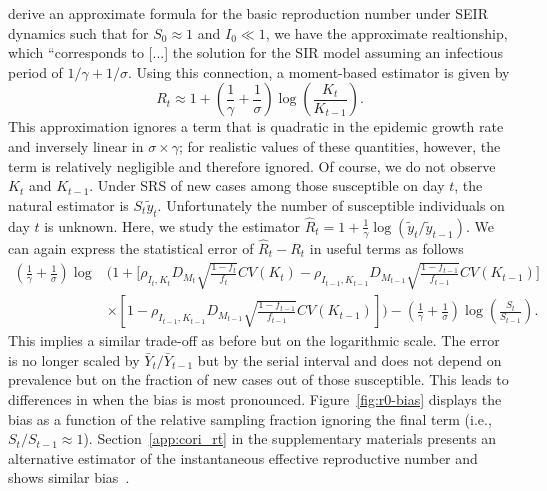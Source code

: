 \documentclass[11pt]{amsart}
\numberwithin{equation}{section}
\theoremstyle{plain}
\begin{document}
\cite{Heng2020} derive an approximate formula for the basic reproduction number under SEIR dynamics such that for $S_0 \approx 1$ and $I_0 \ll 1$, we have the approximate realtionship, which ``corresponds to [...] the solution for the SIR model assuming an infectious period of $1/\gamma + 1/\sigma$. Using this connection, a moment-based estimator is given by
$$
R_t \approx 1 + \left( \frac{1}{\gamma} + \frac{1}{\sigma} \right) \log \left( \frac{K_t}{K_{t-1}} \right).
$$
This approximation ignores a term that is quadratic in the epidemic growth rate and inversely linear in $\sigma \times \gamma$; for realistic values of these quantities, however, the term is relatively negligible and therefore ignored. Of course, we do not observe $K_t$ and $K_{t-1}$.  Under SRS of new cases among those susceptible on day $t$, the natural estimator is $S_t \tilde y_t$.  Unfortunately the number of susceptible individuals on day $t$ is unknown. Here, we study the estimator $\hat R_t = 1 + \frac{1}{\gamma} \log \left( \tilde y_t / \tilde y_{t-1} \right)$. We can again express the statistical error of $\hat R_t - R_t$ in useful terms as follows
 $$
 \begin{aligned}
 \left( \frac{1}{\gamma} + \frac{1}{\sigma} \right)\log &\bigg( 1 + \bigg[ \rho_{I_t,K_t} D_{M_t} \sqrt{\frac{1-f_t}{f_t}} CV (K_t)  -\rho_{I_{t-1},K_{t-1}} D_{M_{t-1}} \sqrt{\frac{1-f_{t-1}}{f_{t-1}}} CV (K_{t-1}) \bigg] \\
 &\times \left[ 1 - \rho_{I_{t-1},K_{t-1}} D_{M_{t-1}} \sqrt{\frac{1-f_{t-1}}{f_{t-1}}} CV (K_{t-1}) \right] \bigg) - \left( \frac{1}{\gamma} + \frac{1}{\sigma} \right) \log \left( \frac{S_t}{S_{t-1}} \right).
 \end{aligned}
 $$
 This implies a similar trade-off as before but on the logarithmic scale.  The error is no longer scaled by $\bar Y_t/\bar Y_{t-1}$ but by the serial interval and does not depend on prevalence but on the fraction of new cases out of those susceptible. This leads to differences in when the bias is most pronounced. Figure~\ref{fig:r0-bias} displays the bias as a function of the relative sampling fraction ignoring the final term (i.e., $S_t / S_{t-1} \approx 1$). Section~\ref{app:cori_rt} in the supplementary materials presents an alternative estimator of the instantaneous effective reproductive number and shows similar bias~\cite{Cori20113}.
\end{document}
